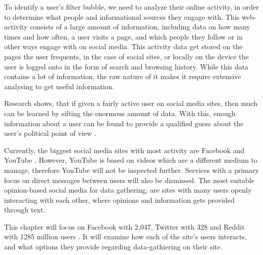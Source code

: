 To identify a user's filter bubble, we need to analyze their online activity, in
order to determine what people and informational sources they engage with. This
web-activity consists of a large amount of information, including data on how
many times and how often, a user visits a page, and which people they follow or
in other ways engage with on social media. This activity data get stored on the
pages the user frequents, in the case of social sites, or locally on the device
the user is logged onto in the form of search and browsing history. While this
data contains a lot of information, the raw nature of it makes it require
extensive analysing to get useful information.\nl

Research shows, that if given a fairly active user on social media sites, then
much can be learned by sifting the enormous amount of data. With this, enough
information about a user can be found to provide a qualified guess about the
user's political point of view \citep{Personality}.\nl

Currently, the biggest social media sites with most activity are Facebook and
YouTube \citep{SocialMediaStats}. However, YouTube is based on videos which are
a different medium to manage, therefore YouTube will not be inspected further.
Services with a primary focus on direct messages between users will also be
dismissed. The most suitable opinion-based social media for data gathering, are
sites with many users openly interacting with each other, where opinions and
information gets provided through text.\nl

This chapter will focus on Facebook with 2,047, Twitter with 328 and Reddit with
1285 million users \citep{FacebookPopularity}. It will examine how each of the
site's users interacts, and what options they provide regarding data-gathiering
on their site.
